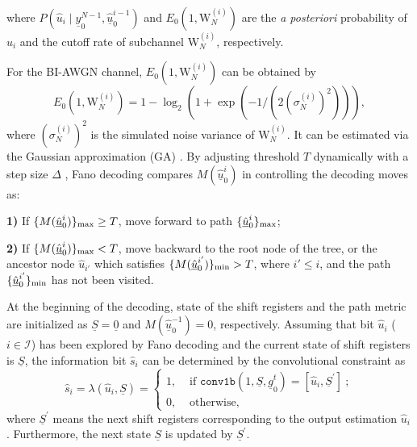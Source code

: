 \documentclass[12pt, draftclsnofoot, peerreview, onecolumn]{IEEEtran}
\theoremstyle{noparent}
\begin{document}
where $P(\hat{u}_{i} \mid \underline{y}_{0}^{N-1}, \underline{\hat{u}}_{0}^{i-1})$ and 
$E_{0}(1, \mathrm{W}_{N}^{(i)})$ are the \textit{a posteriori} probability of $\hat{u}_{i}$
and the cutoff rate of subchannel $\mathrm{W}_{N}^{(i)}$, respectively.








For the BI-AWGN channel, $E_{0}(1, \mathrm{W}_{N}^{(i)})$ can be 
obtained by \cite{Gallager1968InformationTheoryReliable}
\begin{equation}
        E_{0}(1, \mathrm{W}_{N}^{(i)})=
        1-\log_2(1+\exp(-1/(2(\sigma_N^{(i)})^2))),
        \label{cutoff_rate}
\end{equation}
where $(\sigma_N^{(i)})^2$ is the simulated noise variance of $\mathrm{W}_{N}^{(i)}$. It can be estimated via the Gaussian approximation (GA) \cite{Trifonov2012EfficientDesignDecoding}.
By adjusting threshold $T$ dynamically with a step size $\Delta$ \cite{Fano1963heuristicdiscussionprobabilistic}, Fano decoding compares $M(\underline{\hat{u}}_{0}^{i})$ in controlling the decoding moves as:

\textbf{1)} If $\{M(\underline{\hat{u}}_{0}^{i})\}_{\rm{max}} \ge T $, 
move forward to path $\{\underline{\hat{u}}_{0}^{i}\}_{\rm{max}} $;

\textbf{2)} If $\{M(\underline{\hat{u}}_{0}^{i})\}_{\rm{max}}<T$, 
move backward to the root node of the tree, 
or the ancestor node $\hat{u}_{i'}$ which satisfies
$\{M(\underline{\hat{u}}_{0}^{i'})\}_{\rm{min}} > T $, where $i' \leq i$, and the path 
$\{\underline{\hat{u}}_{0}^{i'}\}_{\rm{min}}$ has not been visited.






At the beginning of the decoding, 
state of the shift registers and the path metric are initialized
as $\underline{S}=\underline{0}$ and $M\left(\underline{\hat{u}}_{0}^{-1}\right)=0$, respectively. 
Assuming that bit $\hat{u}_i$ ($i \in \mathcal{I}$) has been explored by Fano decoding and 
the current state of shift registers is $\underline{S}$,
the information bit $\hat{s}_i$ can be determined by the convolutional constraint as 
\begin{equation}
    \hat{s}_{i}=\lambda(\hat{u}_i, \underline{S})=
    \begin{cases}
    1, & \text { if } \texttt{conv1b}(1, \underline{S}, \underline{g}_{0}^{t}) = [\hat{u}_i, \underline{S}^{\prime}]\ ; \\
    0, & \text { otherwise},
    \end{cases}
    \label{conv_bit_decision}
\end{equation} 
where $\underline{S}^{\prime}$ means the next shift registers corresponding to the output estimation $\hat{u}_i$.
Furthermore, the next state $\underline{S}$ is updated by $\underline{S}^{\prime}$.
\end{document}
